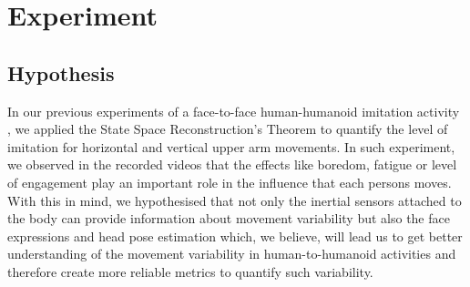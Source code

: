 \documentclass{sigchi}
\begin{document}
\section{Experiment}

\subsection{Hypothesis}
In our previous experiments of a face-to-face human-humanoid imitation
activity \cite{XXX2017}, we applied the State Space Reconstruction's Theorem
to quantify the level of imitation for horizontal and vertical upper arm movements.
In such experiment, we observed in the recorded videos that the effects like
boredom, fatigue or level of engagement play an important role in the influence
that each persons moves.
With this in mind, we hypothesised that not only the inertial sensors attached
to the body can provide information about movement variability but also the
face expressions and head pose estimation which, we believe, will lead us
to get better understanding of the movement variability in human-to-humanoid
activities and therefore create more reliable metrics to quantify such variability.
\end{document}
